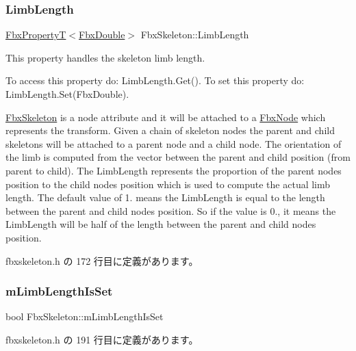\subsubsection{\texorpdfstring{Limb\+Length}{LimbLength}}
{\footnotesize\ttfamily \hyperlink{class_fbx_property_t}{Fbx\+PropertyT}$<$\hyperlink{fbxtypes_8h_a171e72a1c46fc15c1a6c9c31948c1c5b}{Fbx\+Double}$>$ Fbx\+Skeleton\+::\+Limb\+Length}

This property handles the skeleton limb length.

To access this property do\+: Limb\+Length.\+Get(). To set this property do\+: Limb\+Length.\+Set(\+Fbx\+Double).

\hyperlink{class_fbx_skeleton}{Fbx\+Skeleton} is a node attribute and it will be attached to a \hyperlink{class_fbx_node}{Fbx\+Node} which represents the transform. Given a chain of skeleton nodes the parent and child skeletons will be attached to a parent node and a child node. The orientation of the limb is computed from the vector between the parent and child position (from parent to child). The Limb\+Length represents the proportion of the parent node\textquotesingle{}s position to the child node\textquotesingle{}s position which is used to compute the actual limb length. The default value of 1. means the Limb\+Length is equal to the length between the parent and child node\textquotesingle{}s position. So if the value is 0., it means the Limb\+Length will be half of the length between the parent and child node\textquotesingle{}s position. 

 fbxskeleton.\+h の 172 行目に定義があります。

\mbox{\label{class_fbx_skeleton_a59c001b86207731c5c26ca38ec1e78f6}} 
\subsubsection{\texorpdfstring{m\+Limb\+Length\+Is\+Set}{mLimbLengthIsSet}}
{\footnotesize\ttfamily bool Fbx\+Skeleton\+::m\+Limb\+Length\+Is\+Set\hspace{0.3cm}{\ttfamily [protected]}}



 fbxskeleton.\+h の 191 行目に定義があります。

\mbox{\label{class_fbx_skeleton_a9efa86b9d964e60e8a9ed67a4851fc9f}} 
